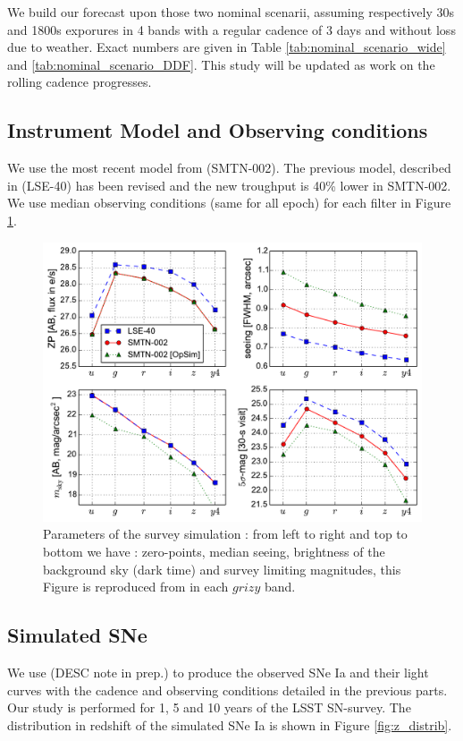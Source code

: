 \documentclass[\docopts]{\docclass}
\begin{document}
We build our forecast upon those two nominal scenarii, assuming respectively 30s and 1800s exporures in 4 bands with a regular cadence of 3 days and without loss due to weather. Exact numbers are given in Table \ref{tab:nominal_scenario_wide}  and \ref{tab:nominal_scenario_DDF}. This study will be updated as work on the rolling cadence progresses.

\subsection{Instrument Model and Observing conditions}

We use the most recent model from \cite{SMTN-002} (SMTN-002). The previous model, described in \cite{LSE-40} (LSE-40) has been revised and the new troughput is 40\% lower  in SMTN-002.
We use median observing conditions (same for all epoch) for each filter in Figure \ref{fig:zp}.

\begin{figure}[t]
\begin{center}
\includegraphics[width=\linewidth]{lsst_model_summary.pdf}
\caption{Parameters of the survey simulation : from left to right and top to bottom we have : zero-points, median seeing, brightness of the background sky (dark time) and survey limiting magnitudes, this Figure is reproduced from \cite{SN-CADENCE} in each $grizy$ band.}
\label{fig:zp}
\end{center}
\end{figure}

\subsection{Simulated SNe}
\label{ssec::snsim}
We use  (DESC note in prep.) to produce the observed SNe Ia and their light curves with the cadence and observing conditions detailed in the previous parts.
Our study is performed for 1, 5 and 10 years of the LSST SN-survey.
The distribution in redshift of the simulated SNe Ia is shown in Figure \ref{fig:z_distrib}.
\end{document}
